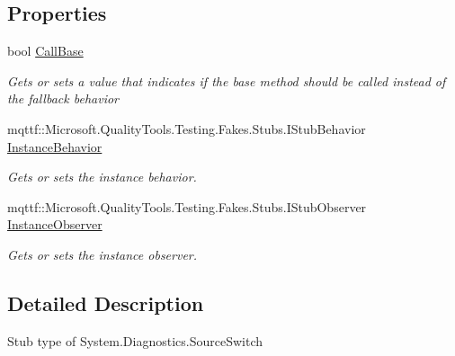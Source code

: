 \subsection*{Properties}
\begin{DoxyCompactItemize}
\item 
bool \hyperlink{class_system_1_1_diagnostics_1_1_fakes_1_1_stub_source_switch_af81b88f29ac70b3bac444dd1c91b19c2}{Call\-Base}
\begin{DoxyCompactList}\small\item\em Gets or sets a value that indicates if the base method should be called instead of the fallback behavior\end{DoxyCompactList}\item 
mqttf\-::\-Microsoft.\-Quality\-Tools.\-Testing.\-Fakes.\-Stubs.\-I\-Stub\-Behavior \hyperlink{class_system_1_1_diagnostics_1_1_fakes_1_1_stub_source_switch_a939bac8163a66c5b204156feb950e1cd}{Instance\-Behavior}
\begin{DoxyCompactList}\small\item\em Gets or sets the instance behavior.\end{DoxyCompactList}\item 
mqttf\-::\-Microsoft.\-Quality\-Tools.\-Testing.\-Fakes.\-Stubs.\-I\-Stub\-Observer \hyperlink{class_system_1_1_diagnostics_1_1_fakes_1_1_stub_source_switch_a96995c3802f8c8b3ae8c885925b030db}{Instance\-Observer}
\begin{DoxyCompactList}\small\item\em Gets or sets the instance observer.\end{DoxyCompactList}\end{DoxyCompactItemize}


\subsection{Detailed Description}
Stub type of System.\-Diagnostics.\-Source\-Switch



